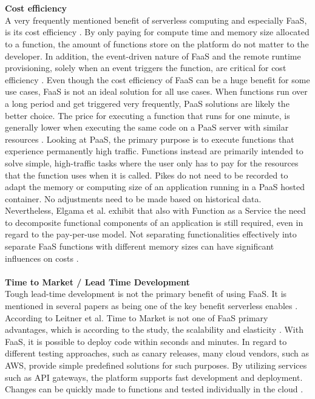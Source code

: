 \documentclass[a4paper,twoside,11pt, pagesize]{scrartcl}
\begin{document}
\begin{spacing}{1.2}
\\\\ \textbf{Cost efficiency}\\ A very frequently mentioned benefit of serverless computing and especially FaaS, is its cost efficiency \cite{lee2018evaluation}. By only paying for compute time and memory size allocated to a function, the amount of functions store on the platform do not matter to the developer. In addition, the event-driven nature of FaaS and the remote runtime provisioning, solely when an event triggers the function, are critical for cost efficiency \cite{feng2018exploring}. Even though the cost efficiency of FaaS can be a huge benefit for some use cases, FaaS is not an ideal solution for all use cases. When functions run over a long period and get triggered very frequently, PaaS solutions are likely the better choice. The price for executing a function that runs for one minute, is generally lower when executing the same code on a PaaS server with similar resources \cite{jonas2019cloud}. Looking at PaaS, the primary purpose is to execute functions that experience permanently high traffic. Functions instead are primarily intended to solve simple, high-traffic tasks where the user only has to pay for the resources that the function uses when it is called. Pikes do not need to be recorded to adapt the memory or computing size of an application running in a PaaS hosted container. No adjustments need to be made based on historical data. Nevertheless, Elgama et al. exhibit that also with Function as a Service the need to decomposite functional components of an application is still required, even in regard to the pay-per-use model. Not separating functionalities effectively into separate FaaS functions with different memory sizes can have significant influences on costs \cite{elgamal2018costless}.\\\\ \textbf{Time to Market / Lead Time Development}\\ Tough lead-time development is not the primary benefit of using FaaS. It is mentioned in several papers as being one of the key benefit serverless enables \cite{adzic2017serverless} \cite{ast2017self}. According to Leitner et al. Time to Market is not one of FaaS primary advantages, which is according to the study, the scalability and elasticity \cite{leitner2019mixed}. With FaaS, it is possible to deploy code within seconds and minutes. In regard to different testing approaches, such as canary releases, many cloud vendors, such as AWS, provide simple predefined solutions for such purposes. By utilizing services such as API gateways, the platform supports fast development and deployment. Changes can be quickly made to functions and tested individually in the cloud \cite{sewak2018winning}.\\\\

\end{spacing}
\end{document}
